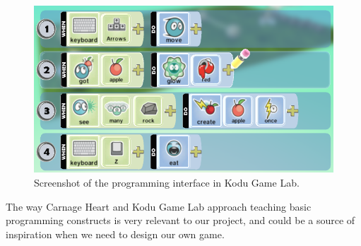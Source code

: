 \begin{figure}[h]
  \centering
    \includegraphics[width=\textwidth]{img/kodu.png}
  \caption{Screenshot of the programming interface in Kodu Game Lab.}
  \label{fig:kodu}
\end{figure}

The way Carnage Heart and Kodu Game Lab approach teaching basic programming constructs is very relevant to our project, and could be a source of inspiration when we need to design our own game.